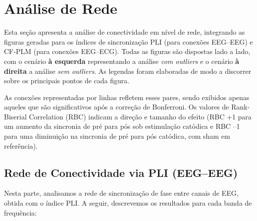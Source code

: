 \chapter{Análise de Rede}

Esta seção apresenta a análise de conectividade em nível de rede, integrando as figuras geradas para os índices de sincronização PLI (para conexões EEG–EEG) e CF‐PLM (para conexões EEG–ECG). Todas as figuras são dispostas lado a lado, com o cenário \textbf{à esquerda} representando a análise \emph{com outliers} e o cenário \textbf{à direita} a análise \emph{sem outliers}. As legendas foram elaboradas de modo a discorrer sobre os principais pontos de cada figura. 

As conexões representadas por linhas refletem esses pares, sendo exibidos apenas aqueles que são significativos após a correção de Bonferroni. Os valores de Rank-Biserial Correlation (RBC) indicam a direção e tamanho do efeito (RBC +1 para um aumento da sincronia de pré para pós sob estimulação catódica e RBC –1 para uma diminuição na sincronia de pré para pós catódica, com sham em referência).

\section{Rede de Conectividade via PLI (EEG–EEG)}

Nesta parte, analisamos a rede de sincronização de fase entre canais de EEG, obtida com o índice PLI.  A seguir, descrevemos os resultados para cada banda de frequência:

